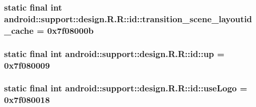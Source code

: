 \hypertarget{classandroid_1_1support_1_1design_1_1_r_1_1id_954c5471748c64bcde376439e904fdcd}{
\subsubsection[{transition\_\-scene\_\-layoutid\_\-cache}]{\setlength{\rightskip}{0pt plus 5cm}static final int android::support::design.R.R::id::transition\_\-scene\_\-layoutid\_\-cache = 0x7f08000b}}
\label{classandroid_1_1support_1_1design_1_1_r_1_1id_954c5471748c64bcde376439e904fdcd}


\hypertarget{classandroid_1_1support_1_1design_1_1_r_1_1id_f5c4098eb41cd7cfa7d5ac39c1100294}{
\subsubsection[{up}]{\setlength{\rightskip}{0pt plus 5cm}static final int android::support::design.R.R::id::up = 0x7f080009}}
\label{classandroid_1_1support_1_1design_1_1_r_1_1id_f5c4098eb41cd7cfa7d5ac39c1100294}


\hypertarget{classandroid_1_1support_1_1design_1_1_r_1_1id_9e00977d56d52255313ab8154d651a0b}{
\subsubsection[{useLogo}]{\setlength{\rightskip}{0pt plus 5cm}static final int android::support::design.R.R::id::useLogo = 0x7f080018}}
\label{classandroid_1_1support_1_1design_1_1_r_1_1id_9e00977d56d52255313ab8154d651a0b}


